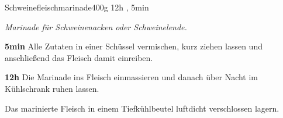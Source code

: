 \documentclass[../recipe-collections/cooking.tex]{subfiles}
\begin{document}
\begin{recipe}{Schweinefleischmarinade}{400g }{12h , 5min }

  \freeform{}\textit{Marinade für Schweinenacken oder Schweinelende.}


  \textbf{5min}
  Alle Zutaten in einer Schüssel vermischen, kurz ziehen lassen und anschließend das Fleisch damit einreiben.

  \newstep{}\textbf{12h}
  Die Marinade ins Fleisch einmassieren und danach über Nacht im Kühlschrank ruhen lassen.

  \freeform{}\hrulefill{}

  \freeform{}
  Das marinierte Fleisch in einem Tiefkühlbeutel luftdicht verschlossen lagern.

\end{recipe}
\end{document}
